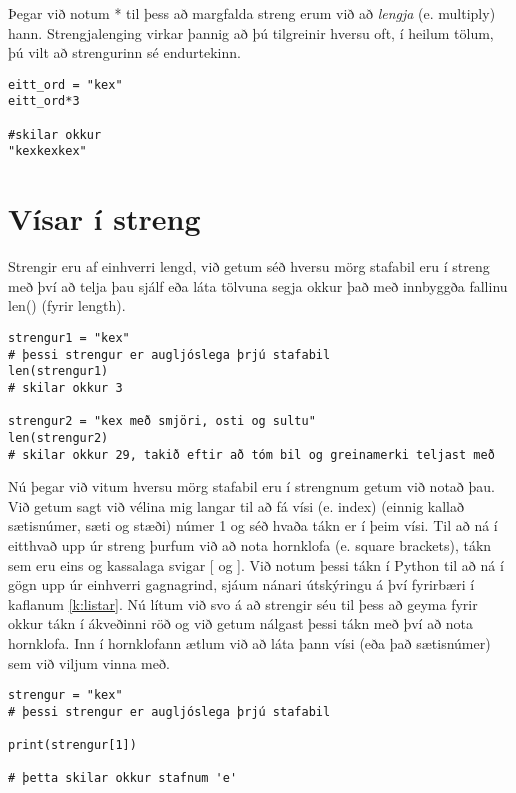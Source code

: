 Þegar við notum * til þess að margfalda streng erum við að \textit{lengja} (e. multiply) hann.
Strengjalenging virkar þannig að þú tilgreinir hversu oft, í heilum tölum, þú vilt að strengurinn sé endurtekinn.

\begin{lstlisting}[caption=Strengjalenging]
eitt_ord = "kex"
eitt_ord*3

#skilar okkur
"kexkexkex"
\end{lstlisting}

\section{Vísar í streng}
Strengir eru af einhverri lengd, við getum séð hversu mörg stafabil eru í streng með því að telja þau sjálf eða láta tölvuna segja okkur það með innbyggða fallinu len() (fyrir length).

\begin{lstlisting}[caption=Stafabilafjöldi, label=lst:stafabil]
strengur1 = "kex"
# þessi strengur er augljóslega þrjú stafabil
len(strengur1) 
# skilar okkur 3

strengur2 = "kex með smjöri, osti og sultu"
len(strengur2)
# skilar okkur 29, takið eftir að tóm bil og greinamerki teljast með
\end{lstlisting}

Nú þegar við vitum hversu mörg stafabil eru í strengnum getum við notað þau.
Við getum sagt við vélina mig langar til að fá vísi (e. index) (einnig kallað sætisnúmer, sæti og stæði) númer 1 og séð hvaða tákn er í þeim vísi.
Til að ná í eitthvað upp úr streng þurfum við að nota hornklofa (e. square brackets), tákn sem eru eins og kassalaga svigar [ og ].
Við notum þessi tákn í Python til að ná í gögn upp úr einhverri gagnagrind, sjáum nánari útskýringu á því fyrirbæri í kaflanum \ref{k:listar}.
Nú lítum við svo á að strengir séu til þess að geyma fyrir okkur tákn í ákveðinni röð og við getum nálgast þessi tákn með því að nota hornklofa.
Inn í hornklofann ætlum við að láta þann vísi (eða það sætisnúmer) sem við viljum vinna með.

\begin{lstlisting}[caption=Vísir 1, label=lst:stafbil2]
strengur = "kex"
# þessi strengur er augljóslega þrjú stafabil

print(strengur[1])

# þetta skilar okkur stafnum 'e'
\end{lstlisting}

